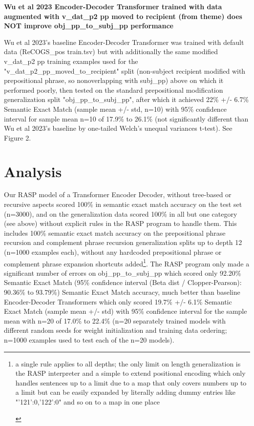 \documentclass[11pt]{article}
\begin{document}
\textbf{Wu et al 2023 Encoder-Decoder Transformer trained with data augmented with v\_dat\_p2 pp moved to recipient (from theme) does NOT improve obj\_pp\_to\_subj\_pp performance}

Wu et al 2023's baseline Encoder-Decoder Transformer was trained with default data (ReCOGS\_pos train.tsv) but with additionally the same modified v\_dat\_p2 pp training examples used for the "v\_dat\_p2\_pp\_moved\_to\_recipient" split (non-subject recipient modified with prepositional phrase, so nonoverlapping with subj\_pp) above on which it performed poorly, then tested on the standard prepositional modification generalization split "obj\_pp\_to\_subj\_pp", after which it achieved 22\% +/- 6.7\% Semantic Exact Match (sample mean +/- std, n=10) with 95\% confidence interval for sample mean n=10 of 17.9\% to 26.1\% (not significantly different than Wu et al 2023's baseline by one-tailed Welch's unequal variances t-test). See Figure 2.

\section{Analysis} 
Our RASP model of a Transformer Encoder Decoder, without tree-based or recursive aspects scored 100\% in semantic exact match accuracy on the \cite{Wu2023} test set (n=3000), and on the generalization data scored 100\% in all but one category (see above) without explicit rules in the RASP program to handle them. This includes 100\% semantic exact match accuracy on the prepositional phrase recursion and complement phrase recursion generalization splits up to depth 12 (n=1000 examples each), without any hardcoded prepositional phrase or complement phrase expansion shortcuts added\footnote{
\begin{tiny}
a single rule applies to all depths; the only limit on length generalization is the RASP interpreter and a simple to extend positional encoding which only handles sentences up to a limit due to a map that only covers numbers up to a limit but can be easily expanded by literally adding dummy entries like "'121':0,'122':0" and so on to a map in one place
\end{tiny}
}. The RASP program only made a significant number of errors on obj\_pp\_to\_subj\_pp which scored only 92.20\% Semantic Exact Match (95\% confidence interval (Beta dist / Clopper-Pearson): 90.36\% to 93.79\%) Semantic Exact Match accuracy, much better than \cite{Wu2023} baseline Encoder-Decoder Transformers which only scored 19.7\% +/- 6.1\% Semantic Exact Match (sample mean +/- std) with 95\% confidence interval for the sample mean with n=20 of 17.0\% to 22.4\% (n=20 separately trained models with different random seeds for weight initialization and training data ordering; n=1000 examples used to test each of the n=20 models).
\end{document}

